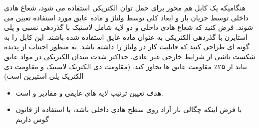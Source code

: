 
\begin{ELexample}{}

هنگامیکه یک کابل هم محور برای حمل توان الکتریکی استفاده می شود، شعاع هادی داخلی توسط جریان بار و ابعاد کلی توسط ولتاژ و ماده عایق مورد استفاده تعیین می شوند. فرض کنید که شعاع هادی داخلی  و دو لایه شامل لاستیک با گذردهی نسبی  و پلی استایرن با گذردهی الکتریکی  به عنوان ماده عایق استفاده شده باشند. این کابل را به گونه ای طراحی کنید که قابلیت کار در ولتاژ  را داشته باشد. به منظور اجتناب از پدیده شکست ناشی از شرایط خارجی غیر عادی، حداکثر شدت میدان الکتریکی در مواد عایق نباید از ۲۵٪ مقاومت عایق ها تجاوز کند. (مقاومت دی الکتریک لاستیک  و مقاومت دی الکتریک پلی استیرین  است)


\begin{ELsolution}

\begin{itemize}
\tightlist
\item
  هدف تعیین ترتیب لایه های عایقی و مقادیر  و  است.
\item
  با فرض اینکه چگالی بار آزاد روی سطح هادی داخلی  باشد، با استفاده از قانون گوس داریم
\end{itemize}


\end{ELsolution}

\end{ELexample}

